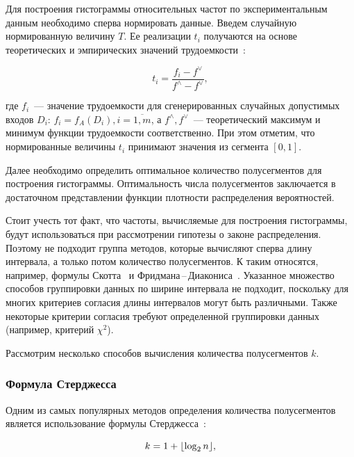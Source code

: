 \documentclass[a4paper, article, 14pt]{extarticle}
\begin{document}
Для построения гистограммы относительных частот по экспериментальным данным необходимо сперва нормировать данные. Введем случайную нормированную величину $T$. Ее реализации $t_i$ получаются на основе теоретических и эмпирических значений трудоемкости~\cite{petrushyn_ulyanov_analysis}:

\begin{equation}\label{eq:t_value}
	t_i = \frac{f_i - f^\vee}{f^\wedge - f^\vee},
\end{equation}

\noindent где $f_i$~--- значение трудоемкости для сгенерированных случайных допустимых входов $D_i$: $f_i = f_A(D_i), i = \overline{1, m}$, а $f^\wedge, f^\vee$~--- теоретический максимум и минимум функции трудоемкости соответственно. При этом отметим, что нормированные величины $t_i$ принимают значения из сегмента $[0, 1]$.

Далее необходимо определить оптимальное количество полусегментов для построения гистограммы. Оптимальность числа полусегментов заключается в достаточном представлении функции плотности распределения вероятностей.

Стоит учесть тот факт, что частоты, вычисляемые для построения гистограммы, будут использоваться при рассмотрении гипотезы о законе распределения. Поэтому не подходит группа методов, которые вычисляют сперва длину интервала, а только потом количество полусегментов. К таким относятся, например, формулы Скотта~\cite{scott} и Фридмана\,--\,Диакониса~\cite{freedman_diaconis}. Указанное множество способов группировки данных по ширине интервала не подходит, поскольку для многих критериев согласия длины интервалов могут быть различными. Также некоторые критерии согласия требуют определенной группировки данных (например, критерий $\chi^2$).

Рассмотрим несколько способов вычисления количества полусегментов $k$.

\subsubsection{Формула Стерджесса}\label{sec:frequency_histogram_size_sturges}

Одним из самых популярных методов определения количества полусегментов является использование формулы Стерджесса~\cite{sturges}:

\begin{equation}\label{eq:sturges_log2}
	k = 1 + \floor*{\log_2{n}},
\end{equation}
\end{document}
